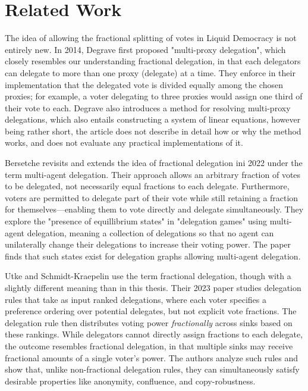 
\chapter{Related Work}
\label{chap:related_work}

The idea of allowing the fractional splitting of votes in Liquid Democracy is not entirely new. In 2014, Degrave first proposed "multi-proxy delegation", which closely resembles our understanding fractional delegation, in that each delegators can delegate to more than one proxy (delegate) at a time. They enforce in their implementation that the delegated vote is divided equally among the chosen proxies; for example, a voter delegating to three proxies would assign one third of their vote to each. Degrave also introduces a method for resolving multi-proxy delegations, which also entails constructing a system of linear equations, however being rather short, the article does not describe in detail how or why the method works, and does not evaluate any practical implementations of it. \cite{degraveResolvingMultiproxyTransitive2014}

Bersetche revisits and extends the idea of fractional delegation ini 2022 under the term multi-agent delegation. Their approach allows an arbitrary fraction of votes to be delegated, not necessarily equal fractions to each delegate. Furthermore, voters are permitted to delegate part of their vote while still retaining a fraction for themselves—enabling them to vote directly and delegate simultaneously. They explore the "presence of equillibrium states" in "delegation games" using multi-agent delegation, meaning a collection of delegations so that no agent can unilaterally change their delegations to increase their voting power. The paper finds that such states exist for delegation graphs allowing multi-agent delegation.  \cite{bersetcheGeneralizingLiquidDemocracy2022}

Utke and Schmidt-Kraepelin use the term fractional delegation, though with a slightly different meaning than in this thesis. Their 2023 paper studies delegation rules that take as input ranked delegations, where each voter specifies a preference ordering over potential delegates, but not explicit vote fractions. The delegation rule then distributes voting power \textit{fractionally} across sinks based on these rankings. While delegators cannot directly assign fractions to each delegate, the outcome resembles fractional delegation, in that multiple sinks may receive fractional amounts of a single voter's power. The authors analyze such rules and show that, unlike non-fractional delegation rules, they can simultaneously satisfy desirable properties like anonymity, confluence, and copy-robustness. \cite{NEURIPS2023_dbb51809}

